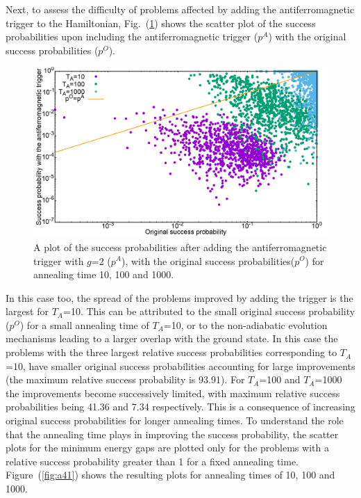 \documentclass[../main.tex]{subfiles}
\begin{document}
Next, to assess the difficulty of problems affected by adding the antiferromagnetic trigger to the Hamiltonian, Fig.~(\ref{fig:a40}) shows the scatter plot of the success probabilities upon including the antiferromagnetic trigger ($p^A$) with the original success probabilities ($p^O$). 


\begin{figure}
\centering 
\includegraphics[scale=0.22]{ProbScat_g2.png}
\caption{A plot of the success probabilities after adding the antiferromagnetic trigger with $g$=2 ($p^A$), with the original success probabilities($p^O$) for annealing time 10, 100 and 1000.}
\label{fig:a40}
\end{figure}
In this case too, the spread of the problems improved by adding the trigger is the largest for $T_A$=10. This can be attributed to the small original success probability ($p^O$) for a small annealing time of $T_A$=10, or to the non-adiabatic evolution mechanisms leading to a larger overlap with the ground state. In this case the problems with the three largest relative success probabilities corresponding to $T_A$=10, have smaller original success probabilities accounting for large improvements (the maximum relative success probability is 93.91). For $T_A$=100 and $T_A$=1000 the improvements become successively limited, with maximum relative success probabilities being 41.36 and 7.34 respectively. This is a consequence of increasing original success probabilities for longer annealing times. To understand the role that the annealing time plays in improving the success probability, the scatter plots for the minimum energy gaps are plotted only for the problems with a relative success probability greater than 1 for a fixed annealing time. Figure~(\ref{fig:a41}) shows the resulting plots for annealing times of 10, 100 and 1000.\\
\end{document}
